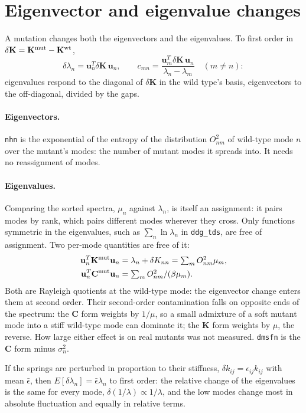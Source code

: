 \documentclass[11pt]{article}
\newcommand{\uu}{\mathbf{u}}
\newcommand{\KK}{\mathbf{K}}
\newcommand{\CC}{\mathbf{C}}
\newcommand{\dK}{\delta\KK}
\newcommand{\code}[1]{\texttt{#1}}
\begin{document}
\section{Eigenvector and eigenvalue changes}

A mutation changes both the eigenvectors and the eigenvalues.
To first order in $\dK=\KK^{\rm mut}-\KK^{\rm wt}$,
\begin{equation}
\delta\lambda_n = \uu_n^T\dK\,\uu_n,
\qquad
c_{mn} = \frac{\uu_m^T\dK\,\uu_n}{\lambda_n-\lambda_m}\quad(m\neq n):
\end{equation}
eigenvalues respond to the diagonal of $\dK$ in the wild type's basis, eigenvectors to the
off-diagonal, divided by the gaps.

\paragraph{Eigenvectors.} \code{nhn} is the exponential of the entropy of the distribution
$O_{nm}^2$ of wild-type mode $n$ over the mutant's modes: the number of mutant modes it spreads
into. It needs no reassignment of modes.

\paragraph{Eigenvalues.} Comparing the sorted spectra, $\mu_n$ against $\lambda_n$, is itself an
assignment: it pairs modes by rank, which pairs different modes wherever they cross.
Only functions symmetric in the eigenvalues, such as $\sum_n\ln\lambda_n$ in \code{ddg\_tds},
are free of assignment. Two per-mode quantities are free of it:
\begin{align}
\uu_n^T\KK^{\rm mut}\uu_n &= \lambda_n + \delta K_{nn} = \textstyle\sum_m O_{nm}^2\mu_m, \\
\uu_n^T\CC^{\rm mut}\uu_n &= \textstyle\sum_m O_{nm}^2/(\beta\mu_m).
\end{align}
Both are Rayleigh quotients at the wild-type mode: the eigenvector change enters them at
second order. Their second-order contamination falls on opposite ends of the spectrum: the
$\CC$ form weights by $1/\mu$, so a small admixture of a soft mutant mode into a stiff wild-type
mode can dominate it; the $\KK$ form weights by $\mu$, the reverse. How large either effect is
on real mutants was not measured. \code{dmsfn} is the $\CC$ form minus $\sigma_n^2$.

If the springs are perturbed in proportion to their stiffness, $\delta k_{ij}=\epsilon_{ij}k_{ij}$
with mean $\bar\epsilon$, then $E[\delta\lambda_n]=\bar\epsilon\lambda_n$ to first order: the relative
change of the eigenvalues is the same for every mode, $\delta(1/\lambda)\propto1/\lambda$, and the low
modes change most in absolute fluctuation and equally in relative terms.
\end{document}
